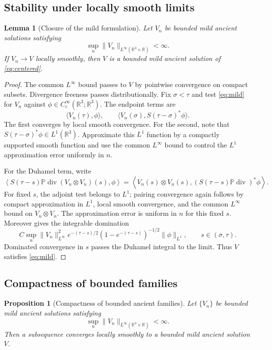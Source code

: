 \documentclass[11pt]{amsart}
\theoremstyle{plain}
\newtheorem{proposition}[theorem]{Proposition}
\newtheorem{lemma}[theorem]{Lemma}
\theoremstyle{definition}
\theoremstyle{remark}
\numberwithin{equation}{section}
\newcommand{\R}{\mathbb R}
\newcommand{\divergence}{\operatorname{div}}
\begin{document}
\subsection{Stability under locally smooth limits}

\begin{lemma}[Closure of the mild formulation]\label{lem:mild-limit}
Let \(V_n\) be bounded mild ancient solutions satisfying
\[
   \sup_n\|V_n\|_{L^\infty(\R^3\times\R)}<\infty .
\]
If \(V_n\to V\) locally smoothly, then \(V\) is a bounded mild ancient solution
of \eqref{eq:centered}.
\end{lemma}

\begin{proof}
The common \(L^\infty\) bound passes to \(V\) by pointwise convergence on
compact subsets.  Divergence freeness passes distributionally.  Fix
\(\sigma<\tau\) and test \eqref{eq:mild} for \(V_n\) against
\(\phi\in C_c^\infty(\R^3;\R^3)\).  The endpoint terms are
\[
   \langle V_n(\tau),\phi\rangle,
   \qquad
   \langle V_n(\sigma),S(\tau-\sigma)^*\phi\rangle .
\]
The first converges by local smooth convergence.  For the second, note that
\(S(\tau-\sigma)^*\phi\in L^1(\R^3)\).  Approximate this \(L^1\) function by
a compactly supported smooth function and use the common \(L^\infty\) bound to
control the \(L^1\) approximation error uniformly in \(n\).

For the Duhamel term, write
\[
   \left\langle
      S(\tau-s)\mathbb P\divergence(V_n\otimes V_n)(s),\phi
   \right\rangle
   =
   \left\langle
      V_n(s)\otimes V_n(s),
      (S(\tau-s)\mathbb P\divergence)^*\phi
   \right\rangle .
\]
For fixed \(s\), the adjoint test belongs to \(L^1\); pairing convergence
again follows by compact approximation in \(L^1\), local smooth convergence,
and the common \(L^\infty\) bound on \(V_n\otimes V_n\).  The approximation
error is uniform in \(n\) for this fixed \(s\).  Moreover
 gives the integrable domination
\[
   C\sup_n\|V_n\|_{L^\infty}^2
   e^{-(\tau-s)/2}(1-e^{-(\tau-s)})^{-1/2}\|\phi\|_{L^1},
   \qquad s\in(\sigma,\tau).
\]
Dominated convergence in \(s\) passes the Duhamel integral to the limit.
Thus \(V\) satisfies \eqref{eq:mild}.
\end{proof}

\subsection{Compactness of bounded families}

\begin{proposition}[Compactness of bounded ancient families]
\label{prop:bounded-compactness}
Let \(\{V_n\}\) be bounded mild ancient solutions satisfying
\[
   \sup_n\|V_n\|_{L^\infty(\R^3\times\R)}<\infty .
\]
Then a subsequence converges locally smoothly to a bounded mild ancient
solution \(V\).
\end{proposition}
\end{document}
